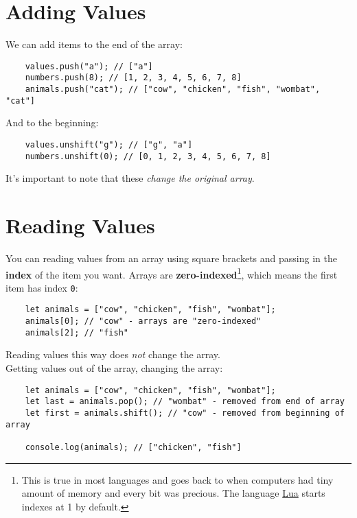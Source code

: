 \pagebreak

\section{Adding Values}

We can add items to the end of the array:

\begin{verbatim}
    values.push("a"); // ["a"]
    numbers.push(8); // [1, 2, 3, 4, 5, 6, 7, 8]
    animals.push("cat"); // ["cow", "chicken", "fish", "wombat", "cat"]
\end{verbatim}

And to the beginning:

\begin{verbatim}
    values.unshift("g"); // ["g", "a"]
    numbers.unshift(0); // [0, 1, 2, 3, 4, 5, 6, 7, 8]
\end{verbatim}

It's important to note that these \textit{change the original array}.


\section{Reading Values}

You can reading values from an array using square brackets and passing in the \textbf{index} of the item you want. Arrays are \textbf{zero-indexed}\footnote{This is true in most languages and goes back to when computers had tiny amount of memory and every bit was precious. The language \href{https://www.lua.org}{Lua} starts indexes at 1 by default.}, which means the first item has index \texttt{0}:

\begin{verbatim}
    let animals = ["cow", "chicken", "fish", "wombat"];
    animals[0]; // "cow" - arrays are "zero-indexed"
    animals[2]; // "fish"
\end{verbatim}

Reading values this way does \textit{not} change the array.
\\

Getting values out of the array, changing the array:

\begin{verbatim}
    let animals = ["cow", "chicken", "fish", "wombat"];
    let last = animals.pop(); // "wombat" - removed from end of array
    let first = animals.shift(); // "cow" - removed from beginning of array

    console.log(animals); // ["chicken", "fish"]
\end{verbatim}

